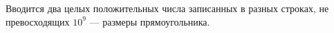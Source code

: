 Вводится два целых положительных числа записанных в разных строках, не превосходящих $10^9$ --- размеры прямоугольника.